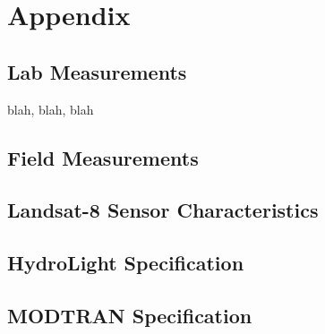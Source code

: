 \appendix
\chapter*{Appendix}
\renewcommand{\thesection}{\Alph{section}}

\section{Lab Measurements}

blah, blah, blah

\section{Field Measurements}
\section{Landsat-8 Sensor Characteristics}
\section{HydroLight Specification}
\section{MODTRAN Specification}